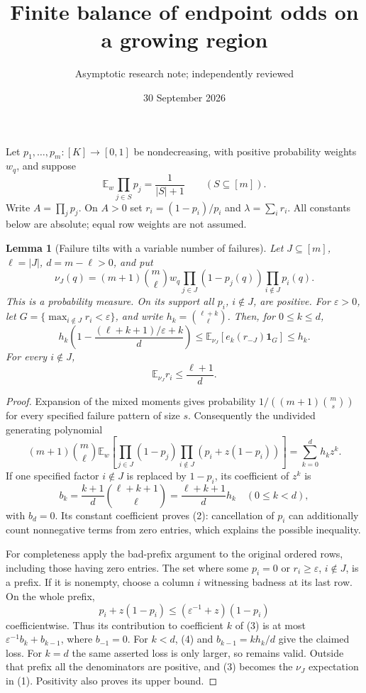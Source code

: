\documentclass[11pt]{article}
\title{Finite balance of endpoint odds on a growing region}
\author{Asymptotic research note; independently reviewed}
\date{30 September 2026}
\newtheorem{lemma}{Lemma}
\newcommand{\E}{\mathbb E}
\begin{document}
\maketitle
Let $p_1,\ldots,p_m:[K]\to[0,1]$ be nondecreasing, with positive
probability weights $w_q$, and suppose
\[
 \E_w\prod_{j\in S}p_j=\frac1{|S|+1}\qquad(S\subseteq[m]).
\]
Write $A=\prod_jp_j$. On $A>0$ set $r_i=(1-p_i)/p_i$ and
$\lambda=\sum_i r_i$. All constants below are absolute; equal row
weights are not assumed.

\begin{lemma}[Failure tilts with a variable number of failures]\label{tilt}
Let $J\subseteq[m]$, $\ell=|J|$, $d=m-\ell>0$, and put
\[
 \nu_J(q)=(m+1)\binom m\ell w_q
       \prod_{j\in J}(1-p_j(q))\prod_{i\notin J}p_i(q).
\]
This is a probability measure. On its support all $p_i$, $i\notin J$,
are positive. For $\varepsilon>0$, let
$G=\{\max_{i\notin J}r_i<\varepsilon\}$, and write
$h_k=\binom{\ell+k}{\ell}$. Then, for $0\le k\le d$,
\[
 h_k\left(1-\frac{(\ell+k+1)/\varepsilon+k}{d}\right)
 \le \E_{\nu_J}[e_k(r_{-J})\boldsymbol1_G]\le h_k.
 \tag{1}
\]
For every $i\notin J$,
\[
 \E_{\nu_J}r_i\le\frac{\ell+1}{d}.                 \tag{2}
\]
\end{lemma}
\begin{proof}
Expansion of the mixed moments gives probability
$1/((m+1)\binom ms)$ for every specified failure pattern of size $s$.
Consequently the undivided generating polynomial
\[
 (m+1)\binom m\ell\E_w\left[
  \prod_{j\in J}(1-p_j)
  \prod_{i\notin J}(p_i+z(1-p_i))\right]
 =\sum_{k=0}^d h_k z^k.                            \tag{3}
\]
If one specified factor $i\notin J$ is replaced by $1-p_i$, its
coefficient of $z^k$ is
\[
 b_k=\frac{k+1}{d}\binom{\ell+k+1}{\ell}
     =\frac{\ell+k+1}{d}h_k \quad(0\le k<d),
 \tag{4}
\]
with $b_d=0$. Its constant coefficient proves (2): cancellation
of $p_i$ can additionally count nonnegative terms from zero entries,
which explains the possible inequality.

For completeness apply the bad-prefix argument to the original
ordered rows, including those having zero entries. The set where
some $p_i=0$ or $r_i\ge\varepsilon$, $i\notin J$, is a prefix.
If it is nonempty, choose a column $i$ witnessing badness at its
last row. On the whole prefix,
\[
 p_i+z(1-p_i)\le(\varepsilon^{-1}+z)(1-p_i)
\]
coefficientwise. Thus its contribution to coefficient $k$ of (3)
is at most $\varepsilon^{-1}b_k+b_{k-1}$, where $b_{-1}=0$.
For $k<d$, (4) and $b_{k-1}=kh_k/d$ give the claimed loss. For
$k=d$ the same asserted loss is only larger, so remains valid.
Outside that prefix all the denominators are positive, and (3)
becomes the $\nu_J$ expectation in (1). Positivity also proves
its upper bound.
\end{proof}
\end{document}
